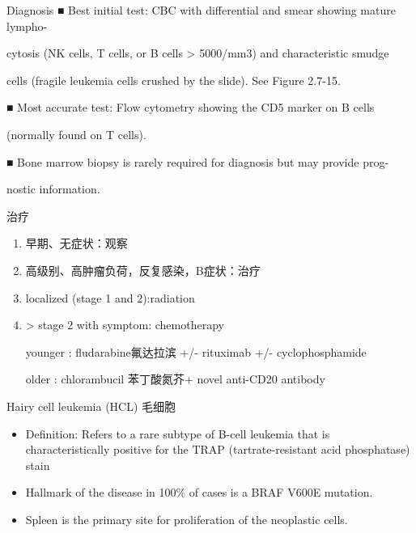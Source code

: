 \documentclass[
  ignorenonframetext,
]{beamer}
\begin{document}
\begin{frame}
\begin{block}{Diagnosis}
\protect\hypertarget{diagnosis-2}{}
■ Best initial test: CBC with differential and smear showing mature
lympho-

cytosis (NK cells, T cells, or B cells \textgreater{} 5000/mm3) and
characteristic smudge

cells (fragile leukemia cells crushed by the slide). See Figure 2.7-15.

■ Most accurate test: Flow cytometry showing the CD5 marker on B cells

(normally found on T cells).

■ Bone marrow biopsy is rarely required for diagnosis but may provide
prog-

nostic information.
\end{block}
\end{frame}

\begin{frame}
\begin{block}{治疗}
\protect\hypertarget{ux6cbbux7597-8}{}
\begin{enumerate}
\item
  早期、无症状：观察
\item
  高级别、高肿瘤负荷，反复感染，B症状：治疗
\item
  localized (stage 1 and 2):radiation
\item
  \textgreater{} stage 2 with symptom: chemotherapy

  younger : fludarabine氟达拉滨 +/- rituximab +/- cyclophosphamide

  older : chlorambucil 苯丁酸氮芥+ novel anti-CD20 antibody
\end{enumerate}
\end{block}
\end{frame}

\begin{frame}
\begin{block}{Hairy cell leukemia (HCL) 毛细胞}
\protect\hypertarget{hairy-cell-leukemia-hcl-ux6bdbux7ec6ux80de}{}
\begin{itemize}
\item
  Definition: Refers to a rare subtype of B-cell leukemia that is
  characteristically positive for the TRAP (tartrate-resistant acid
  phosphatase) stain
\item
  Hallmark of the disease in 100\% of cases is a BRAF V600E mutation.
\item
  Spleen is the primary site for proliferation of the neoplastic cells.
\end{itemize}
\end{block}
\end{frame}
\end{document}

